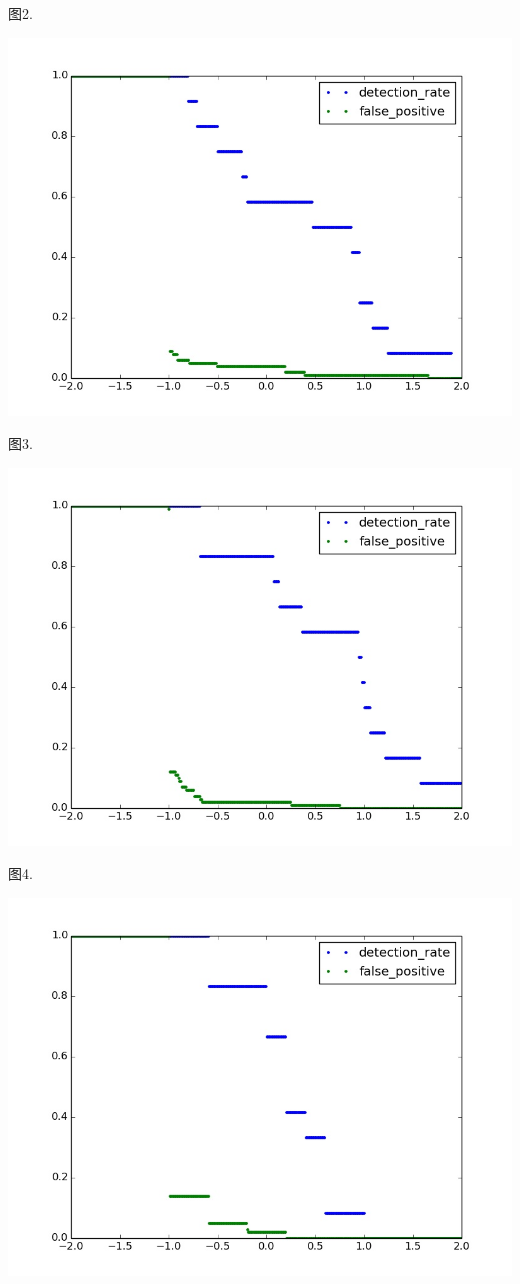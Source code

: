 \documentclass{ctexart}
\begin{document}
\begin{center}
图2.

\includegraphics[height=10cm]{./graphics/GradientBoostingRegressor_4E0.6L.jpg}

图3.

\includegraphics[height=10cm]{./graphics/GradientBoostingRegressor_6E0.5L.jpg}

图4. 

\includegraphics[height=10cm]{./graphics/RandomForestRegressor_5E.jpg}


\end{center}
\end{document}
